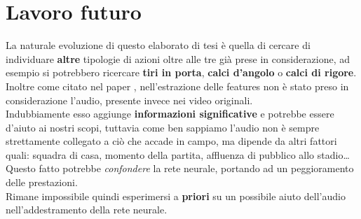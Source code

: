 \section{Lavoro futuro}
La naturale evoluzione di questo elaborato di tesi è quella di cercare di individuare \textbf{altre} tipologie di azioni oltre alle tre già prese in considerazione, ad esempio si potrebbero ricercare \textbf{tiri in porta}, \textbf{calci d'angolo} o \textbf{calci di rigore}.
\\Inoltre come citato nel paper \citep{soccerNet}, nell'estrazione delle features non è stato preso in considerazione l'audio, presente invece nei video originali.
\\Indubbiamente esso aggiunge \textbf{informazioni significative} e potrebbe essere d'aiuto ai nostri scopi, tuttavia come ben sappiamo l'audio non è sempre strettamente collegato a ciò che accade in campo, ma dipende da altri fattori quali: squadra di casa, momento della partita, affluenza di pubblico allo stadio\ldots
\\Questo fatto potrebbe \textit{confondere} la rete neurale, portando ad un peggioramento delle prestazioni.
\\Rimane impossibile quindi esperimersi a \textbf{priori} su un possibile aiuto dell'audio nell'addestramento della rete neurale.
